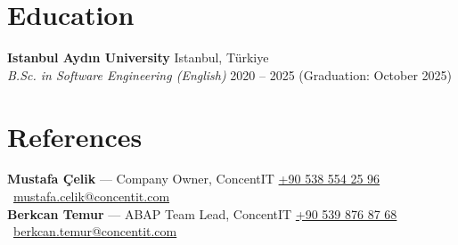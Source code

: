 \documentclass[10pt,a4paper]{extarticle}
\begin{document}
\section{Education}
\textbf{Istanbul Aydın University} \hfill Istanbul, Türkiye\\
\textit{B.Sc. in Software Engineering (English)} \hfill 2020 -- 2025 (Graduation: October 2025)
\section{References}
\textbf{Mustafa Çelik} --- Company Owner, ConcentIT \hfill \href{tel:+905385542596}{+90 538 554 25 96} \textbullet\ \href{mailto:mustafa.celik@concentit.com}{mustafa.celik@concentit.com}\\
\textbf{Berkcan Temur} --- ABAP Team Lead, ConcentIT \hfill \href{tel:+905398768768}{+90 539 876 87 68} \textbullet\ \href{mailto:berkcan.temur@concentit.com}{berkcan.temur@concentit.com}
\end{document}

